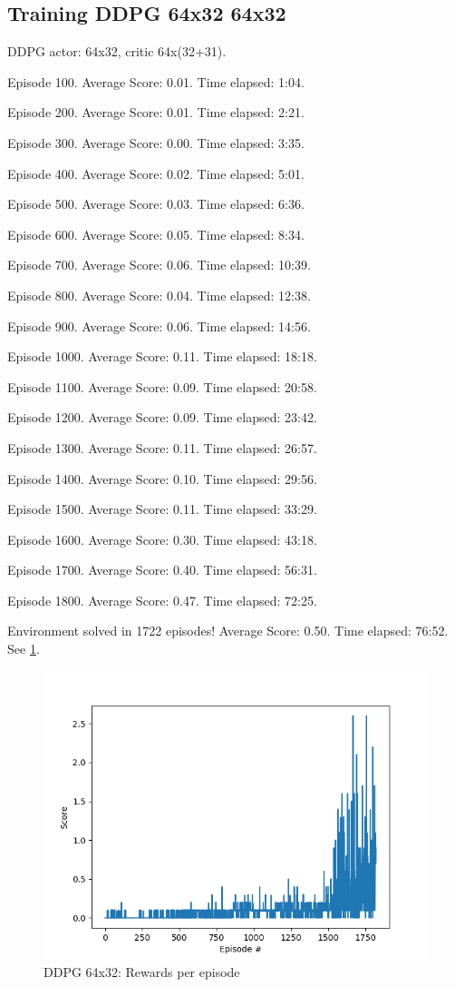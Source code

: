 \documentclass{report}
\begin{document}
\subsection*{Training DDPG 64x32 64x32}

DDPG actor: 64x32, critic 64x(32+31).

Episode 100.	Average Score: 0.01.	Time elapsed: 1:04.

Episode 200.	Average Score: 0.01.	Time elapsed: 2:21.

Episode 300.	Average Score: 0.00.	Time elapsed: 3:35.

Episode 400.	Average Score: 0.02.	Time elapsed: 5:01.

Episode 500.	Average Score: 0.03.	Time elapsed: 6:36.

Episode 600.	Average Score: 0.05.	Time elapsed: 8:34.

Episode 700.	Average Score: 0.06.	Time elapsed: 10:39.

Episode 800.	Average Score: 0.04.	Time elapsed: 12:38.

Episode 900.	Average Score: 0.06.	Time elapsed: 14:56.

Episode 1000.	Average Score: 0.11.	Time elapsed: 18:18.

Episode 1100.	Average Score: 0.09.	Time elapsed: 20:58.

Episode 1200.	Average Score: 0.09.	Time elapsed: 23:42.

Episode 1300.	Average Score: 0.11.	Time elapsed: 26:57.

Episode 1400.	Average Score: 0.10.	Time elapsed: 29:56.

Episode 1500.	Average Score: 0.11.	Time elapsed: 33:29.

Episode 1600.	Average Score: 0.30.	Time elapsed: 43:18.

Episode 1700.	Average Score: 0.40.	Time elapsed: 56:31.

Episode 1800.	Average Score: 0.47.	Time elapsed: 72:25.

Environment solved in 1722 episodes!	Average Score: 0.50.	Time elapsed: 76:52. See \ref{fig:DDPG_64x32}.

\begin{figure}
	\includegraphics[width=0.9\linewidth]{res/ddpg_64x32/score.png}
	\caption{DDPG 64x32: Rewards per episode}
	\label{fig:DDPG_64x32}
\end{figure}
\end{document}
